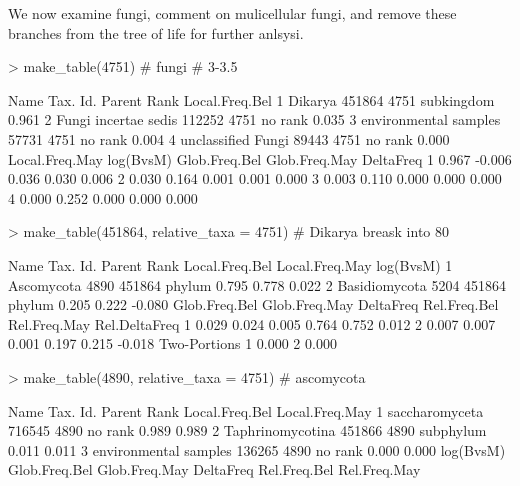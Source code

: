 \documentclass{article}
\begin{document}
We now examine fungi, comment on mulicellular fungi, and remove these branches from the tree of life for further anlsysi.

\begin{Schunk}
\begin{Sinput}
> make_table(4751) # fungi  # 3-3.5% are uncertain. Let's ignore.
\end{Sinput}
\begin{Soutput}
                   Name Tax. Id. Parent       Rank Local.Freq.Bel
1               Dikarya   451864   4751 subkingdom          0.961
2  Fungi incertae sedis   112252   4751    no rank          0.035
3 environmental samples    57731   4751    no rank          0.004
4    unclassified Fungi    89443   4751    no rank          0.000
  Local.Freq.May log(BvsM) Glob.Freq.Bel Glob.Freq.May DeltaFreq
1          0.967    -0.006         0.036         0.030     0.006
2          0.030     0.164         0.001         0.001     0.000
3          0.003     0.110         0.000         0.000     0.000
4          0.000     0.252         0.000         0.000     0.000
\end{Soutput}
\begin{Sinput}
> make_table(451864, relative_taxa = 4751) # Dikarya  breask into 80% ascomycota and 20% basidiomycota
\end{Sinput}
\begin{Soutput}
           Name Tax. Id. Parent   Rank Local.Freq.Bel Local.Freq.May log(BvsM)
1    Ascomycota     4890 451864 phylum          0.795          0.778     0.022
2 Basidiomycota     5204 451864 phylum          0.205          0.222    -0.080
  Glob.Freq.Bel Glob.Freq.May DeltaFreq Rel.Freq.Bel Rel.Freq.May Rel.DeltaFreq
1         0.029         0.024     0.005        0.764        0.752         0.012
2         0.007         0.007     0.001        0.197        0.215        -0.018
  Two-Portions
1        0.000
2        0.000
\end{Soutput}
\begin{Sinput}
> make_table(4890, relative_taxa = 4751) # ascomycota
\end{Sinput}
\begin{Soutput}
                   Name Tax. Id. Parent      Rank Local.Freq.Bel Local.Freq.May
1        saccharomyceta   716545   4890   no rank          0.989          0.989
2      Taphrinomycotina   451866   4890 subphylum          0.011          0.011
3 environmental samples   136265   4890   no rank          0.000          0.000
  log(BvsM) Glob.Freq.Bel Glob.Freq.May DeltaFreq Rel.Freq.Bel Rel.Freq.May

\end{Soutput}
\end{Schunk}
\end{document}
